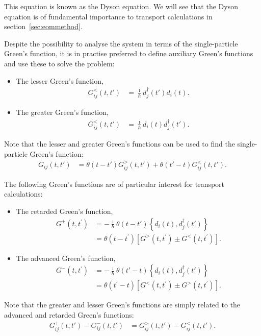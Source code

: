 This equation is known as the Dyson equation. We will see that the Dyson equation is of fundamental importance to transport calculations in section~\ref{sec:eommethod}.

Despite the possibility to analyse the system in terms of the single-particle Green's function, it is in practise preferred to define auxiliary Green's functions and use these to solve the problem:
\begin{itemize}
\item The lesser Green's function, 
\begin{align*}
G^<_{ij}(t,t') &= \frac{\imath}{\hbar}d^\dagger_j(t')d_i(t).
\end{align*}
\item The greater Green's function, 
\begin{align*}
G^<_{ij}(t,t') &= \frac{\imath}{\hbar}d_i(t)d^\dagger_j(t').
\end{align*}
\end{itemize}
Note that the lesser and greater Green's functions can be used to find the single-particle Green's function:
\begin{align*}
G_{ij}(t,t') &= \theta(t-t')G^>_{ij} (t,t') + \theta(t'-t) G_{ij}^<(t,t').
\end{align*}

The following Green's functions are of particular interest for transport calculations: 
\begin{itemize}
\item The retarded Green's function, \begin{align*}
G^+(t,t^\prime) &=
-\frac{\imath}{\hbar} \theta(t-t') \left\{ d_i(t), d^\dagger_j(t')\right\}
\\ &=\theta(t-t^\prime) \left[ G^>(t,t^\prime) \pm G^<(t,t^\prime)\right].
\end{align*}
\item The advanced Green's function, \begin{align*}
G^-(t,t^\prime) &=
-\frac{\imath}{\hbar} \theta(t'-t) \left\{ d_i(t), d^\dagger_j(t')\right\}
\\ &= \theta(t^\prime-t) \left[ G^<(t,t^\prime) \pm G^>(t,t^\prime)\right].
\end{align*}
\end{itemize}
Note that the greater and lesser Green's functions are simply related to the advanced and retarded Green's functions:
\begin{align*}
G^+_{ij}(t,t') - G^-_{ij}(t,t') &= G^>_{ij}(t,t') - G^<_{ij}(t,t').
\end{align*}

